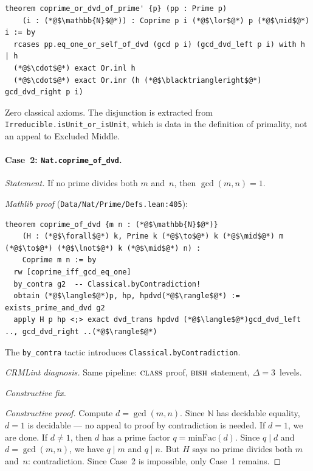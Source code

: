 \documentclass[12pt, a4paper]{article}
\theoremstyle{plain}
\theoremstyle{definition}
\theoremstyle{remark}
\newcommand{\BISH}{\textsc{bish}}
\newcommand{\CLASS}{\textsc{class}}
\begin{document}
\begin{lstlisting}
theorem coprime_or_dvd_of_prime' {p} (pp : Prime p)
    (i : (*@$\mathbb{N}$@*)) : Coprime p i (*@$\lor$@*) p (*@$\mid$@*) i := by
  rcases pp.eq_one_or_self_of_dvd (gcd p i) (gcd_dvd_left p i) with h | h
  (*@$\cdot$@*) exact Or.inl h
  (*@$\cdot$@*) exact Or.inr (h (*@$\blacktriangleright$@*) gcd_dvd_right p i)
\end{lstlisting}

Zero classical axioms.  The disjunction is extracted from
\texttt{Irreducible.isUnit\_or\_isUnit}, which is data in the
definition of primality, not an appeal to Excluded Middle.

\paragraph{Case~2: \texttt{Nat.coprime\_of\_dvd}.}
\emph{Statement.}  If no prime divides both $m$ and~$n$, then
$\gcd(m,n) = 1$.

\emph{Mathlib proof} (\texttt{Data/Nat/Prime/Defs.lean:405}):

\begin{lstlisting}
theorem coprime_of_dvd {m n : (*@$\mathbb{N}$@*)}
    (H : (*@$\forall$@*) k, Prime k (*@$\to$@*) k (*@$\mid$@*) m (*@$\to$@*) (*@$\lnot$@*) k (*@$\mid$@*) n) :
    Coprime m n := by
  rw [coprime_iff_gcd_eq_one]
  by_contra g2  -- Classical.byContradiction!
  obtain (*@$\langle$@*)p, hp, hpdvd(*@$\rangle$@*) := exists_prime_and_dvd g2
  apply H p hp <;> exact dvd_trans hpdvd (*@$\langle$@*)gcd_dvd_left .., gcd_dvd_right ..(*@$\rangle$@*)
\end{lstlisting}

The \texttt{by\_contra} tactic introduces \texttt{Classical.byContradiction}.

\emph{CRMLint diagnosis.}  Same pipeline: $\CLASS$ proof, $\BISH$ statement, $\Delta = 3$~levels.

\emph{Constructive fix.}

\begin{proof}[Constructive proof]
Compute $d = \gcd(m, n)$.  Since $\mathbb{N}$ has decidable equality,
$d = 1$ is decidable --- no appeal to proof by contradiction is
needed.  If $d = 1$, we are done.  If $d \neq 1$, then $d$ has a
prime factor $q = \mathrm{minFac}(d)$.  Since $q \mid d$ and
$d = \gcd(m,n)$, we have $q \mid m$ and $q \mid n$.  But $H$ says no
prime divides both $m$ and~$n$: contradiction.  Since Case~2 is
impossible, only Case~1 remains.
\end{proof}
\end{document}
